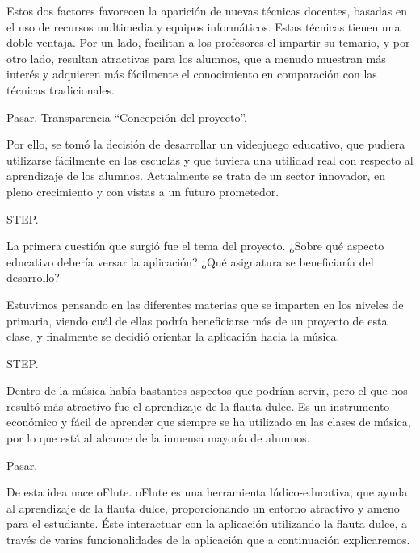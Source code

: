 \documentclass[landscape]{article}
\newenvironment{nota}
{%
\begin{framed} \noindent\itshape
}
{%
\end{framed}\vspace{-0.5cm} }
\begin{document}
\begin{multicols*}{2}
Estos dos factores favorecen la aparición de nuevas técnicas docentes, basadas
en el uso de recursos multimedia y equipos informáticos. Estas técnicas tienen
una doble ventaja. Por un lado, facilitan a los profesores el impartir su
temario, y por otro lado, resultan atractivas para los alumnos, que a menudo
muestran más interés y adquieren más fácilmente el conocimiento en comparación
con las técnicas tradicionales.

\begin{nota}
  Pasar. Transparencia ``Concepción del proyecto''.
\end{nota}

Por ello, se tomó la decisión de desarrollar un videojuego educativo, que
pudiera utilizarse fácilmente en las escuelas y que tuviera una utilidad real
con respecto al aprendizaje de los alumnos. Actualmente se trata de un sector
innovador, en pleno crecimiento y con vistas a un futuro prometedor.

\begin{nota}
  STEP.
\end{nota}

La primera cuestión que surgió fue el tema del proyecto. ¿Sobre qué aspecto
educativo debería versar la aplicación? ¿Qué asignatura se beneficiaría del
desarrollo?

Estuvimos pensando en las diferentes materias que se imparten en los niveles de
primaria, viendo cuál de ellas podría beneficiarse más de un proyecto de esta
clase, y finalmente se decidió orientar la aplicación hacia la música.

\begin{nota}
  STEP.
\end{nota}

Dentro de la música había bastantes aspectos que podrían servir, pero el que nos
resultó más atractivo fue el  aprendizaje de la flauta dulce. Es
un instrumento económico y fácil de aprender que siempre se ha utilizado en las
clases de música, por lo que está al alcance de la inmensa mayoría de alumnos.

\begin{nota}
  Pasar.
\end{nota}

De esta idea nace oFlute. oFlute es una herramienta lúdico-educativa, que ayuda
al aprendizaje de la flauta dulce, proporcionando un entorno atractivo y ameno
para el estudiante. Éste interactuar con la aplicación utilizando la flauta
dulce, a través de varias funcionalidades de la aplicación que a continuación
explicaremos.


\end{multicols*}
\end{document}
